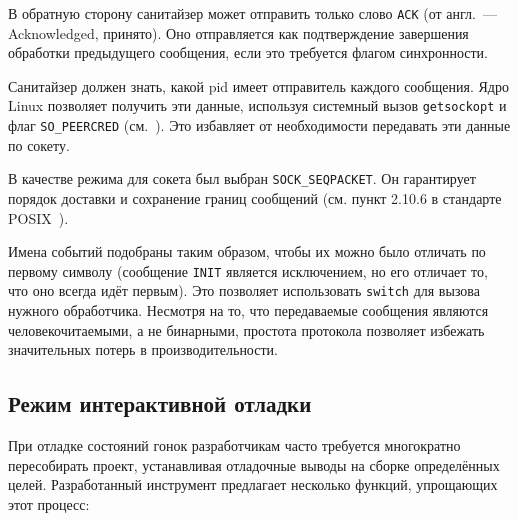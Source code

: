 В обратную сторону санитайзер может отправить только слово \texttt{ACK} (от англ.~--- Acknowledged, принято). Оно отправляется как подтверждение завершения обработки предыдущего сообщения, если это требуется флагом синхронности.

Санитайзер должен знать, какой pid имеет отправитель каждого сообщения. Ядро Linux позволяет получить эти данные, используя системный вызов \texttt{getsockopt} и флаг \texttt{SO\_PEERCRED} (см.~\cite{unix-sockets}). Это избавляет от необходимости передавать эти данные по сокету.

В качестве режима для сокета был выбран \texttt{SOCK\_SEQPACKET}. Он гарантирует порядок доставки и сохранение границ сообщений (см. пункт 2.10.6 в стандарте POSIX~\cite{8277153}).

Имена событий подобраны таким образом, чтобы их можно было отличать по первому символу (сообщение \texttt{INIT} является исключением, но его отличает то, что оно всегда идёт первым). Это позволяет использовать \texttt{switch} для вызова нужного обработчика. Несмотря на то, что передаваемые сообщения являются человекочитаемыми, а не бинарными, простота протокола позволяет избежать значительных потерь в производительности.

\subsection{Режим интерактивной отладки}
\label{subsec:interactive-debug}

При отладке состояний гонок разработчикам часто требуется многократно пересобирать проект, устанавливая отладочные выводы на сборке определённых целей. Разработанный инструмент предлагает несколько функций, упрощающих этот процесс:

